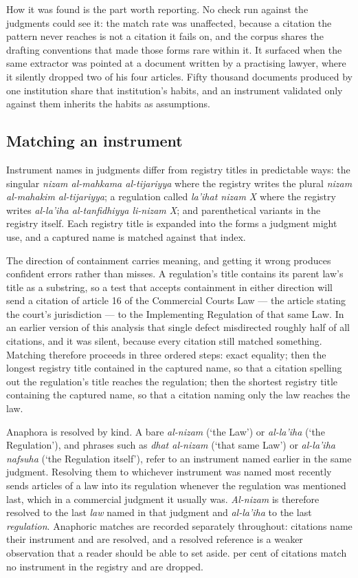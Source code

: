 \documentclass[11pt]{article}
\begin{document}
How it was found is the part worth reporting. No check run against the
judgments could see it: the match rate was unaffected, because a citation the
pattern never reaches is not a citation it fails on, and the corpus shares the
drafting conventions that made those forms rare within it. It surfaced when
the same extractor was pointed at a document written by a practising lawyer,
where it silently dropped two of his four articles. Fifty thousand documents
produced by one institution share that institution's habits, and an instrument
validated only against them inherits the habits as assumptions.

\subsection{Matching an instrument}
\label{sec:matching}

Instrument names in judgments differ from registry titles in predictable
ways: the singular \emph{nizam al-mahkama al-tijariyya} where the registry
writes the plural \emph{nizam al-mahakim al-tijariyya}; a regulation called
\emph{la'ihat nizam X} where the registry writes \emph{al-la'iha
al-tanfidhiyya li-nizam X}; and parenthetical variants in the registry itself. Each registry title is expanded into the forms a judgment
might use, and a captured name is matched against that index.

The direction of containment carries meaning, and getting it wrong produces
confident errors rather than misses. A regulation's title contains its parent
law's title as a substring, so a test that accepts containment in either
direction will send a citation of article 16 of the Commercial Courts Law
--- the article stating the court's jurisdiction --- to the Implementing
Regulation of that same Law. In an earlier
version of this analysis that single defect misdirected roughly half of all
citations, and it was silent, because every citation still matched something.
Matching therefore proceeds in three ordered steps: exact equality; then the
longest registry title contained in the captured name, so that a citation
spelling out the regulation's title reaches the regulation; then the shortest
registry title containing the captured name, so that a citation naming only
the law reaches the law.

Anaphora is resolved by kind. A bare \emph{al-nizam} (`the Law') or
\emph{al-la'iha} (`the Regulation'), and phrases such as \emph{dhat al-nizam}
(`that same Law') or \emph{al-la'iha nafsuha} (`the Regulation itself'),
refer to an instrument named earlier in the same judgment. Resolving them to whichever instrument was named
most recently sends articles of a law into its regulation whenever the
regulation was mentioned last, which in a commercial judgment it usually was.
\emph{Al-nizam} is therefore resolved to the last \emph{law} named in that
judgment and \emph{al-la'iha} to the last \emph{regulation}. Anaphoric matches are recorded
separately throughout: \nNamed{} citations name their instrument and
\nAnaphoric{} are resolved, and a resolved reference is a weaker observation
that a reader should be able to set aside. \nUnmatchedShare{} per cent of
citations match no instrument in the registry and are dropped.
\end{document}
